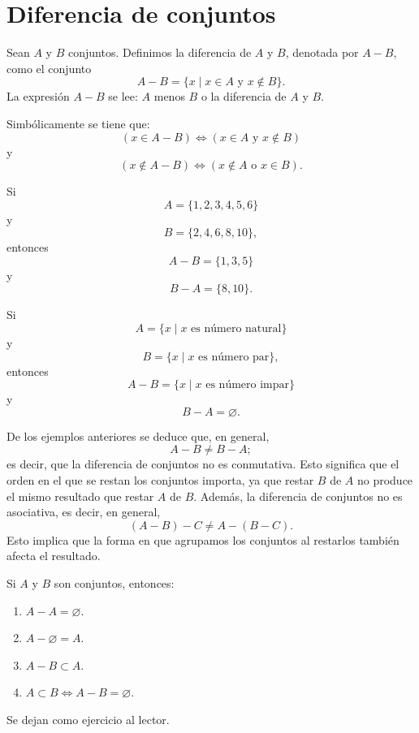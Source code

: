 \newpage

\section{Diferencia de conjuntos}

\begin{definicion}{}{}
    Sean $A$ y $B$ conjuntos. Definimos la diferencia de $A$ y $B$, denotada por $A - B$, como el conjunto
    $$A - B = \{x \mid x \in A \text { y } x \notin B\}.$$
    La expresión $A - B$ se lee: $A$ menos $B$ o la diferencia de $A$ y $B$.
\end{definicion}

Simbólicamente se tiene que:
$$(x \in A - B) \Longleftrightarrow(x \in A \text{ y } x \notin B)$$
y
$$(x \notin A - B) \Longleftrightarrow(x \notin A \text{ o } x \in B).$$

\begin{examplebox}{}{}
    Si
    $$A = \{1,  2,  3,  4,  5,  6\}$$
    y
    $$B = \{2,  4,  6,  8,  10\},$$
    entonces
    $$A - B = \{1,  3,  5\}$$
    y
    $$B - A = \{8,  10\}.$$
\end{examplebox}

\begin{examplebox}{}{}
    Si
    $$A = \{x \mid x \text { es número natural}\}$$
    y
    $$B = \{x \mid x \text { es número par}\},$$
    entonces 
    $$A - B = \{x \mid x \text { es número impar}\}$$
    y
    $$B - A = \varnothing.$$
\end{examplebox}

De los ejemplos anteriores se deduce que, en general,
$$A - B \neq B - A;$$
es decir, que la diferencia de conjuntos no es conmutativa. Esto significa que el orden en el que se restan los conjuntos importa, ya que restar $B$ de $A$ no produce el mismo resultado que restar $A$ de $B$. Además, la diferencia de conjuntos no es asociativa, es decir, en general,
$$(A - B) - C \neq A - (B - C).$$
Esto implica que la forma en que agrupamos los conjuntos al restarlos también afecta el resultado.

\begin{prop}{}{}
    Si $A$ y $B$ son conjuntos, entonces:
    \begin{enumerate}[label=\roman*., topsep=6pt, itemsep=0pt]
        \item $A - A = \varnothing$.
        \item $A - \varnothing = A$.
        \item $A - B \subset A$.
        \item $A \subset B \Longleftrightarrow A - B = \varnothing$.
    \end{enumerate}
    \tcblower
    \demostracion Se dejan como ejercicio al lector.
\end{prop}

